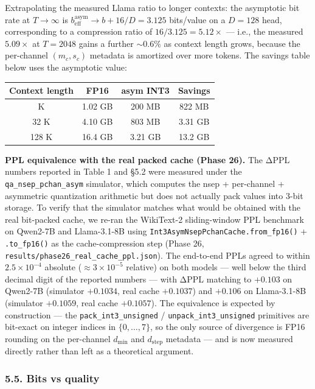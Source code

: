 \documentclass[
]{article}
\newcounter{none} %
\begin{document}
Extrapolating the measured Llama ratio to longer contexts: the
asymptotic bit rate at \(T \to \infty\) is
\(b_\text{eff}^\text{asym} \to b + 16/D = 3.125\) bits/value on a
\(D = 128\) head, corresponding to a compression ratio of
\(16 / 3.125 = 5.12\times\) --- i.e., the measured \(5.09\times\) at
\(T = 2048\) gains a further \(\sim 0.6 \%\) as context length grows,
because the per-channel \((m_c, s_c)\) metadata is amortized over more
tokens. The savings table below uses the asymptotic value:

{\def\LTcaptype{none} %
\begin{longtable}[]{@{}cccc@{}}
\toprule\noalign{}
Context length & FP16 & asym INT3 & Savings \\
\midrule\noalign{}
\endhead
\bottomrule\noalign{}
\endlastfoot
8 K & 1.02 GB & 200 MB & 822 MB \\
32 K & 4.10 GB & 803 MB & 3.31 GB \\
128 K & 16.4 GB & 3.21 GB & 13.2 GB \\
\end{longtable}
}

\textbf{PPL equivalence with the real packed cache (Phase 26).} The ΔPPL
numbers reported in Table 1 and §5.2 were measured under the
\texttt{qa\_nsep\_pchan\_asym} simulator, which computes the nsep +
per-channel + asymmetric quantization arithmetic but does not actually
pack values into 3-bit storage. To verify that the simulator matches
what would be obtained with the real bit-packed cache, we re-ran the
WikiText-2 sliding-window PPL benchmark on Qwen2-7B and Llama-3.1-8B
using \texttt{Int3AsymNsepPchanCache.from\_fp16()} +
\texttt{.to\_fp16()} as the cache-compression step (Phase 26,
\texttt{results/phase26\_real\_cache\_ppl.json}). The end-to-end PPLs
agreed to within \(2.5 \times 10^{-4}\) absolute
(\(\approx 3 \times 10^{-5}\) relative) on both models --- well below
the third decimal digit of the reported numbers --- with ΔPPL matching
to \(+0.103\) on Qwen2-7B (simulator \(+0.1034\), real cache
\(+0.1037\)) and \(+0.106\) on Llama-3.1-8B (simulator \(+0.1059\), real
cache \(+0.1057\)). The equivalence is expected by construction --- the
\texttt{pack\_int3\_unsigned} / \texttt{unpack\_int3\_unsigned}
primitives are bit-exact on integer indices in \(\{0, \dots, 7\}\), so
the only source of divergence is FP16 rounding on the per-channel
\(d_{\min}\) and \(d_{\mathrm{step}}\) metadata --- and is now measured
directly rather than left as a theoretical argument.

\subsubsection{5.5. Bits vs quality}\label{bits-vs-quality}
\end{document}
